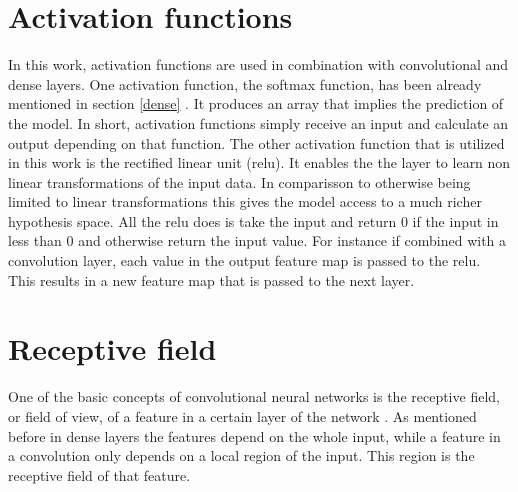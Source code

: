 \section{Activation functions} 
\label{activation}
In this work, activation functions are used in combination with convolutional and dense layers. One activation function, the softmax function, has been already mentioned in section \ref{dense} . It produces an array that implies the prediction of the model. In short, activation functions simply receive an input and calculate an output depending on that function. The other activation function that is utilized in this work is the rectified linear unit (relu). It enables the the layer to learn non linear transformations of the input data. In comparisson to otherwise being limited to linear transformations this gives the model access to a much richer hypothesis space. All the relu does is take the input and return 0 if the input in less than 0 and otherwise return the input value. For instance if combined with a convolution layer, each value in the output feature map is passed to the relu. This results in a new feature map that is passed to the next layer. 


\section{Receptive field}
\label{receptive_field}
One of the basic concepts of convolutional neural networks is the receptive field, or field of view, of a feature in a certain layer of the network . As mentioned before in dense layers the features depend on the whole input, while a feature in a convolution only depends on a local region of the input. This region is the receptive field of that feature. 

